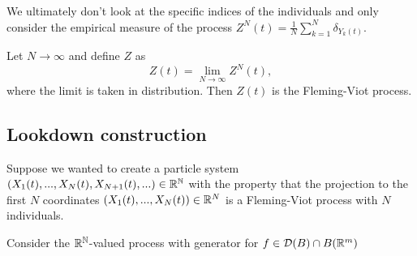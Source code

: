 \documentclass{article}
\begin{document}
We ultimately don't look at the specific indices of the individuals and only consider the empirical measure of the process $Z^N(t)=\frac{1}{N}\sum_{k=1}^N\delta_{Y_k(t)}$.

Let $N\rightarrow\infty$ and define $Z$ as
\begin{equation*}
    Z(t)=\lim_{N\rightarrow\infty}Z^N(t),
\end{equation*}
where the limit is taken in distribution.
Then $Z(t)$ is the Fleming-Viot process.

\subsection{Lookdown construction}
Suppose we wanted to create a particle system $(X_1(t),...,X_N(t),X_{N+1}(t),...)\in\mathbb{R}^{{\mathbb N}}$ with the property that the projection to the first $N$ coordinates $(X_1(t),...,X_N(t))\in\mathbb{R}^N$ is a Fleming-Viot process with $N$ individuals. 

Consider the $\mathbb{R}^{{\mathbb N}}$-valued process with generator for $f\in\mathcal D(B)\cap B(\mathbb{R}^m)$
\end{document}

